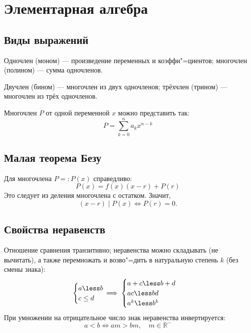 \section{Элементарная алгебра}


\subsection{Виды выражений}

{\ital Одночлен \color{desc}(моном)} --- произведение переменных и коэффи"=циентов; {\ital многочлен \color{desc}(полином)} --- сумма одночленов.

{\ital Двучлен \color{desc}(бином)} --- многочлен из двух одночленов; {\ital трёхчлен {\color{desc}(трином)}} --- многочлен из трёх одночленов.

Многочлен $P$ от одной переменной $x$ можно представить так:
$$P=\sum^{n}_{k=0}a_kx^{n-k}$$

\subsection{Малая теорема Безу}

Для многочлена $P=:P(x)$ справедливо:
$$P(x)=f(x)(x-r)+P(r)$$
Это следует из деления многочлена с остатком. Значит,
$$(x-r)\mid P(x)\iff P(r)=0.$$

\subsection{Свойства неравенств}

Отношение сравнения {\ital транзитивно}; неравенства можно {\ital складывать}
{\ital\color{desc}(не вычитать)}, а также {\ital перемножать} и возво"=дить
в натуральную степень $k$ {\ital\color{desc}(без смены знака)}:
$$
\begin{cases}
a\less b\\
c\leq d
\end{cases}\hspace*{-12pt}\implies
\begin{cases}
a + c\less b + d\\
ac\less bd\\
a^k\less b^k
\end{cases}
$$
При умножении на отрицательное число знак неравенства {\ital инвертируется}:
$$a\less b\iff am\greater bm,\quad m\in\mathbb{R}^-$$

